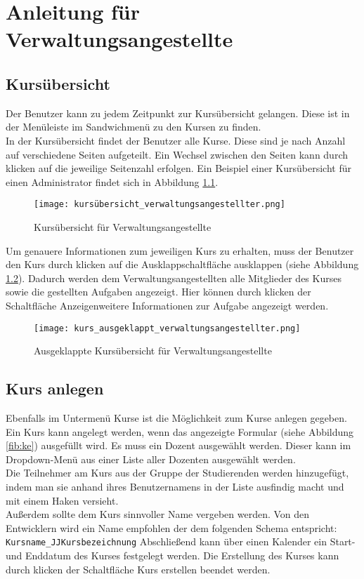 
\chapter{Anleitung für Verwaltungsangestellte}
\label{sec:chap1}
\section{Kursübersicht}
Der Benutzer kann zu jedem Zeitpunkt zur Kursübersicht gelangen. Diese ist in der Menüleiste im Sandwichmenü zu den Kursen zu finden.\\
In der Kursübersicht findet der Benutzer alle Kurse. Diese sind je nach Anzahl auf verschiedene Seiten aufgeteilt. Ein Wechsel zwischen den Seiten kann durch klicken auf die jeweilige Seitenzahl erfolgen. Ein Beispiel einer Kursübersicht für einen Administrator findet sich in Abbildung \ref{fib:kü}.

\begin{figure}[h]
\centering
\texttt{[image: kursübersicht\_verwaltungsangestellter.png]}
\caption{Kursübersicht für Verwaltungsangestellte}
\label{fib:kü}
\end{figure}

Um genauere Informationen zum jeweiligen Kurs zu erhalten, muss der Benutzer den Kurs durch klicken auf die Ausklappschaltfläche ausklappen (siehe Abbildung \ref{fib:kü-ausgeklappt}). Dadurch werden dem Verwaltungsangestellten alle Mitglieder des Kurses sowie die gestellten Aufgaben angezeigt. Hier können durch klicken der Schaltfläche \glqq Anzeigen\grqq weitere Informationen zur Aufgabe angezeigt werden. 

\begin{figure}[h]
\centering
\texttt{[image: kurs\_ausgeklappt\_verwaltungsangestellter.png]}
\caption{Ausgeklappte Kursübersicht für Verwaltungsangestellte}
\label{fib:kü-ausgeklappt}
\end{figure}

\section{Kurs anlegen}
Ebenfalls im Untermenü Kurse ist die Möglichkeit zum Kurse anlegen gegeben.\\
Ein Kurs kann angelegt werden, wenn das angezeigte Formular (siehe Abbildung \ref{fib:ke}) ausgefüllt wird. Es muss ein Dozent ausgewählt werden. Dieser kann im Dropdown-Menü aus einer Liste aller Dozenten ausgewählt werden. \\
Die Teilnehmer am Kurs aus der Gruppe der Studierenden werden hinzugefügt, indem man sie anhand ihres Benutzernamens in der Liste ausfindig macht und mit einem Haken versieht. \\
Außerdem sollte dem Kurs sinnvoller Name vergeben werden. Von den Entwicklern wird ein Name empfohlen der dem folgenden Schema entspricht: \\
\verb/Kursname_JJKursbezeichnung/
Abschließend kann über einen Kalender ein Start- und Enddatum des Kurses festgelegt werden. 
Die Erstellung des Kurses kann durch klicken der Schaltfläche \glqq Kurs erstellen\grqq\: beendet werden.

